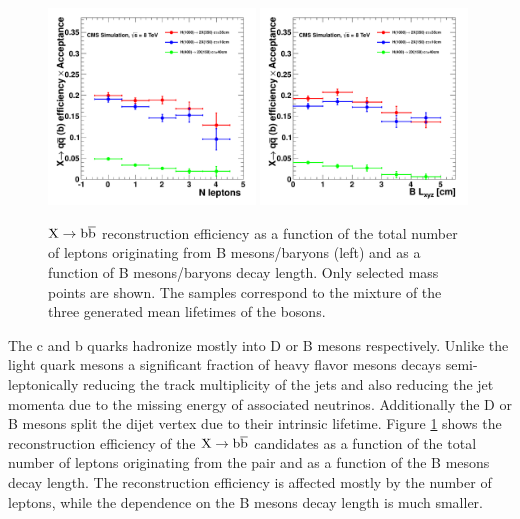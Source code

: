 \begin{figure}[htbp]
\centering
\includegraphics[width=0.49\textwidth]{plots/signal/effNLepb.pdf}
\includegraphics[width=0.49\textwidth]{plots/signal/effBlxyzb.pdf}
\caption{$\X \to \bbbar$ reconstruction efficiency as a function of the total number of leptons 
originating from B mesons/baryons (left) and as a function of B mesons/baryons decay length. Only selected 
mass points are shown. The samples correspond to the mixture of the three generated mean 
lifetimes of the \X bosons. \label{fig:effb}}
\end{figure}

The c and b quarks hadronize mostly into D or B mesons respectively.
 Unlike the light quark mesons a significant fraction of heavy flavor
mesons decays semi-leptonically reducing the track multiplicity of the jets and also reducing the jet momenta
 due to the missing energy of associated neutrinos. 
Additionally the D or B mesons split the dijet vertex due to their intrinsic lifetime.
Figure \ref{fig:effb} shows the reconstruction efficiency of the $\X \to \bbbar$ candidates as a function
of the total number of leptons originating from the \bbbar pair and as a function of the B mesons decay
length. The reconstruction efficiency is affected mostly by the number of leptons, while the dependence on the
B mesons decay length is much smaller.

